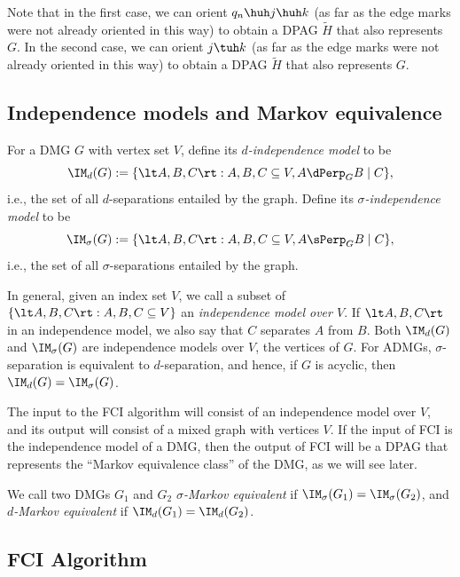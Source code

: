 Note that in the first case, we can orient $q_n \huh j \huh k$ (as far as the edge marks were not already oriented in this way) to obtain a DPAG $\tilde{H}$ that also represents $G$. 
In the second case, we can orient $j \tuh k$ (as far as the edge marks were not already oriented in this way) to obtain a DPAG $\tilde{H}$ that also represents $G$.

\subsection{Independence models and Markov equivalence}

\begin{Def}\label{def:independence_model}
  For a DMG $G$ with vertex set $V$, define its \emph{$d$-independence model} to be
  $$\IM_d(G) := \{ \lt A, B, C \rt : A, B, C \subseteq V, A \dPerp_G B \mid C \},$$
  i.e., the set of all $d$-separations entailed by the graph. Define its
  \emph{$\sigma$-independence model} to be
  $$\IM_\sigma(G) := \{ \lt A, B, C \rt : A, B, C \subseteq V, A \sPerp_G B \mid C \},$$
  i.e., the set of all $\sigma$-separations entailed by the graph. 
\end{Def}
In general, given an index set $V$, we call a subset of 
$\{ \lt A, B, C \rt : A, B, C \subseteq V \}$
an \emph{independence model over $V$}.
If $\lt A, B, C \rt$ in an independence model, we also say that $C$ separates $A$ from $B$.
Both $\IM_d(G)$ and $\IM_\sigma(G)$ are independence models over $V$, the vertices of $G$.
For ADMGs, $\sigma$-separation is equivalent to $d$-separation, and hence, if $G$ is acyclic, then
$\IM_d(G) = \IM_\sigma(G)$.

The input to the FCI algorithm will consist of an independence model over $V$,
and its output will consist of a mixed graph with vertices $V$.
If the input of FCI is the independence model of a DMG, then the output of FCI
will be a DPAG that represents the ``Markov equivalence class'' of the DMG, as
we will see later.
\begin{Def}\label{def:Markov_equivalent}
  We call two DMGs $G_1$ and $G_2$ \emph{$\sigma$-Markov equivalent} if $\IM_\sigma(G_1) = \IM_\sigma(G_2)$,
  and \emph{$d$-Markov equivalent} if $\IM_d(G_1) = \IM_d(G_2)$.
\end{Def}

\subsection{FCI Algorithm}

